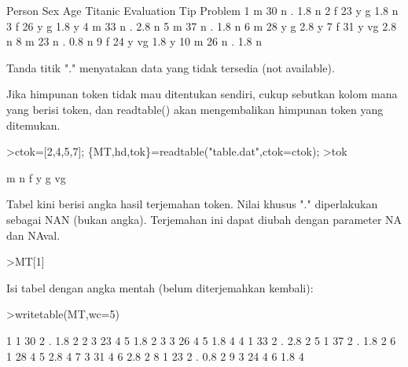 \documentclass[a4paper,10pt]{article}
\begin{document}
\begin{eulernotebook}
\begin{eulercomment}
\begin{eulercomment}
\begin{eulercomment}
\begin{eulercomment}
\begin{eulercomment}
\begin{eulercomment}
\begin{eulercomment}
\begin{eulercomment}
\begin{euleroutput}
   Person  Sex  Age Titanic Evaluation  Tip Problem
        1    m   30       n          .  1.8       n
        2    f   23       y          g  1.8       n
        3    f   26       y          g  1.8       y
        4    m   33       n          .  2.8       n
        5    m   37       n          .  1.8       n
        6    m   28       y          g  2.8       y
        7    f   31       y         vg  2.8       n
        8    m   23       n          .  0.8       n
        9    f   24       y         vg  1.8       y
       10    m   26       n          .  1.8       n
\end{euleroutput}
\begin{eulercomment}
Tanda titik "." menyatakan data yang tidak tersedia (not available).

Jika himpunan token tidak mau ditentukan sendiri, cukup sebutkan kolom mana yang berisi
token, dan readtable() akan mengembalikan himpunan token yang ditemukan.
\end{eulercomment}
\begin{eulerprompt}
>ctok=[2,4,5,7]; \{MT,hd,tok\}=readtable("table.dat",ctok=ctok);
>tok
\end{eulerprompt}
\begin{euleroutput}
  m
  n
  f
  y
  g
  vg
\end{euleroutput}
\begin{eulercomment}
Tabel kini berisi angka hasil terjemahan token. Nilai khusus "." diperlakukan sebagai
NAN (bukan angka). Terjemahan ini dapat diubah dengan parameter NA dan NAval.
\end{eulercomment}
\begin{eulerprompt}
>MT[1]
\end{eulerprompt}
\begin{euleroutput}
  [1,  1,  30,  2,  NAN,  1.8,  2]
\end{euleroutput}
\begin{eulercomment}
Isi tabel dengan angka mentah (belum diterjemahkan kembali):
\end{eulercomment}
\begin{eulerprompt}
>writetable(MT,wc=5)
\end{eulerprompt}
\begin{euleroutput}
      1    1   30    2    .  1.8    2
      2    3   23    4    5  1.8    2
      3    3   26    4    5  1.8    4
      4    1   33    2    .  2.8    2
      5    1   37    2    .  1.8    2
      6    1   28    4    5  2.8    4
      7    3   31    4    6  2.8    2
      8    1   23    2    .  0.8    2
      9    3   24    4    6  1.8    4

\end{euleroutput}
\end{eulercomment}
\end{eulercomment}
\end{eulercomment}
\end{eulercomment}
\end{eulercomment}
\end{eulercomment}
\end{eulercomment}
\end{eulercomment}
\end{eulernotebook}
\end{document}
